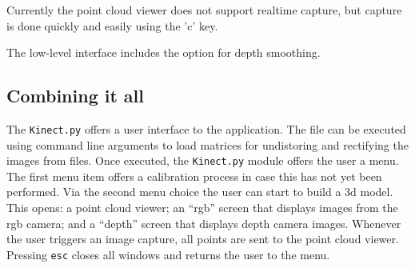 Currently the point cloud viewer does not support realtime capture, but capture
is done quickly and easily using the 'c' key.

The low-level interface includes the option for depth smoothing.

\subsection{Combining it all}


The \texttt{Kinect.py} offers a user interface to the application. The file can
be executed using command line arguments to load matrices for undistoring and
rectifying the images from files. Once executed, the \texttt{Kinect.py} module
offers the user a menu. The first menu item offers a calibration process in case
this has not yet been performed.  Via the second menu choice the user can start
to build a 3d model. This opens: a point cloud viewer; an ``rgb'' screen that
displays images from the rgb camera; and a ``depth'' screen that displays depth
camera images. Whenever the user triggers an image capture, all points are sent
to the point cloud viewer. Pressing \texttt{esc} closes all windows and returns
the user to the menu.
